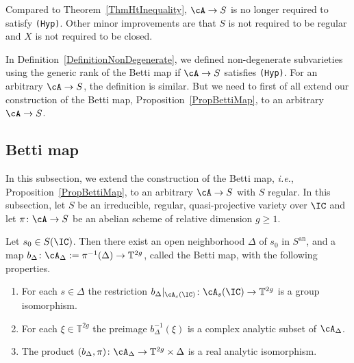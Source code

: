 Compared to Theorem~\ref{ThmHtInequality}, $\cA \rightarrow S$ is no longer required to satisfy {\tt (Hyp)}. Other minor improvements are that $S$ is not required to be regular and $X$ is not required to be closed.

In Definition~\ref{DefinitionNonDegenerate}, we defined non-degenerate subvarieties using the generic rank of the Betti map if $\cA \rightarrow S$ satisfies {\tt (Hyp)}. For an arbitrary $\cA \rightarrow S$, the definition is similar. But we need to first of all extend our construction of the Betti map, Proposition~\ref{PropBettiMap}, to an arbitrary $\cA \rightarrow S$.




\subsection{Betti map}
In this subsection, we extend the construction of the Betti map, \textit{i.e.}, Proposition~\ref{PropBettiMap}, to an arbitrary $\cA \rightarrow S$ with $S$ regular. %
In this subsection, let $S$ be an  irreducible, regular, quasi-projective variety over $\IC$ and let $\pi \colon \cA \rightarrow S$ be an abelian scheme of relative dimension $g \ge 1$.


\begin{proposition}
\notready\label{PropBettiMapApp}
Let $s_0 \in S(\IC)$. Then there exist an open neighborhood $\Delta$ of $s_0$ in $S^{\mathrm{an}}$, and a map $b_{\Delta} \colon \cA_{\Delta} := \pi^{-1}(\Delta) \rightarrow \mathbb T^{2g}$, called the Betti map, with the following properties.
\begin{enumerate}
\item[(i)] For each $s \in \Delta$ the restriction $b_{\Delta}|_{\cA_s(\IC)} \colon \cA_s(\IC) \rightarrow \mathbb T^{2g}$ is a group isomorphism.
\item[(ii)] For each $\xi \in \mathbb T^{2g}$ the preimage $b_{\Delta}^{-1}(\xi)$ is a complex analytic subset of $\cA_{\Delta}$.
\item[(iii)] The product
$(b_{\Delta},\pi) \colon \cA_{\Delta} \rightarrow \mathbb
T^{2g} \times \Delta$ is a real analytic isomorphism.%
\end{enumerate}
\end{proposition}

